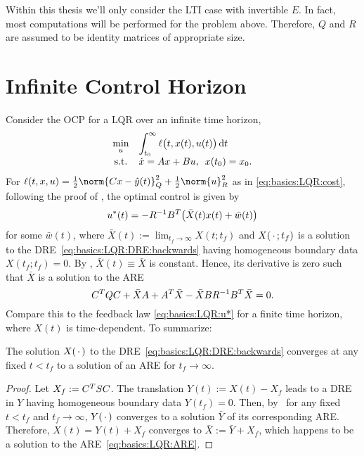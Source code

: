 Within this thesis we'll only consider the \ac{LTI} case with invertible $E$.
In fact, most computations will be performed for the problem above.
Therefore, $Q$ and $R$ are assumed to be identity matrices of appropriate size.

\section{Infinite Control Horizon}

Consider the \ac{OCP} for a \ac{LQR} over an infinite time horizon,
\begin{equation}
\label{eq:basics:OCP'}
  \everymath{\displaystyle}
  \begin{array}{cl}
    \min_u & \int_{t_0}^{\infty} \ell\big(t, x(t), u(t)\big) \dt \\
    \text{s.t.} & \dot{x} = Ax + Bu, \enspace x(t_0) = x_0
    .
  \end{array}
\end{equation}
For
$
  \ell(t, x, u) = \onehalf \norm{Cx - \hat y(t)}_Q^2 + \onehalf \norm{u}_R^2
$
as in \eqref{eq:basics:LQR:cost},
following the proof of \cite[Theorem~3.2]{Locatelli2011},
the optimal control is given by
\begin{equation}
  u^*(t) = - R^{-1} B^T \big( \bar X(t) x(t) + \bar w(t) \big)
\end{equation}
for some $\bar w(t)$,
where $\bar X(t) := \lim_{t_f \to\infty} X(t; t_f)$
and $X(\optional{};t_f)$ is a solution to the \ac{DRE}~\eqref{eq:basics:LQR:DRE:backwards}
having homogeneous boundary data $X(t_f; t_f) = 0$. %
By \cite[Theorem~3.3]{Locatelli2011},
$\bar X(t) \equiv \bar X$ is constant.
Hence, its derivative is zero such that $\bar X$ is a solution to the \ac{ARE}
\begin{equation}
\label{eq:basics:LQR:ARE}
  C^T Q C + \bar X A + A^T \bar X - \bar X B R^{-1} B^T \bar X = 0
  .
\end{equation}
Compare this to the feedback law \eqref{eq:basics:LQR:u*} for a finite time horizon,
where $X(t)$ is time-dependent.
To summarize:

\begin{theorem}
\label{thm:basics:dre-limit-are:backwards}
  The solution $X(\optional{})$ to the \ac{DRE}~\eqref{eq:basics:LQR:DRE:backwards}
  converges at any fixed $t<t_f$ to a solution of an \ac{ARE} for $t_f \to\infty$.
\end{theorem}
\begin{proof}
  Let $X_f := C^T S C$.
  The translation $Y(t) := X(t) - X_f$ leads to a \ac{DRE} in $Y$
  having homogeneous boundary data $Y(t_f) = 0$.
  Then, by~\cite[Theorem~3.3]{Locatelli2011} for any fixed $t<t_f$ and $t_f\to\infty$,
  $Y(\optional{})$ converges to a solution $\bar Y$ of its corresponding \ac{ARE}.
  Therefore, \mbox{$X(t) = Y(t) + X_f$} converges to \mbox{$\bar X := \bar Y + X_f$},
  which happens to be a solution to the \ac{ARE}~\eqref{eq:basics:LQR:ARE}.
\end{proof}

